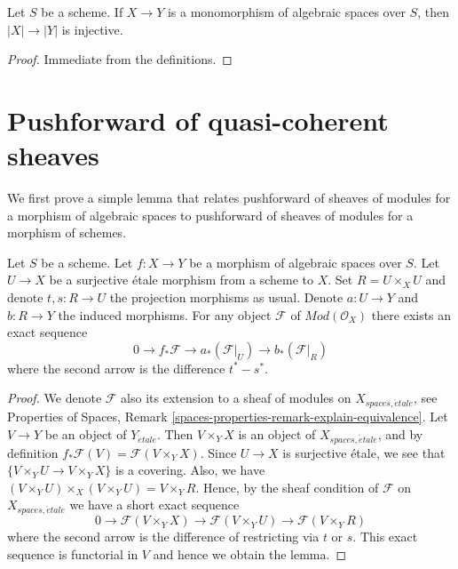 \begin{lemma}
\label{lemma-monomorphism-injective-points}
Let $S$ be a scheme. If $X \to Y$ is a monomorphism of algebraic spaces
over $S$, then $|X| \to |Y|$ is injective.
\end{lemma}

\begin{proof}
Immediate from the definitions.
\end{proof}















\section{Pushforward of quasi-coherent sheaves}
\label{section-pushforward}

\noindent
We first prove a simple lemma that relates pushforward of sheaves of modules
for a morphism of algebraic spaces to pushforward of sheaves of modules for
a morphism of schemes.

\begin{lemma}
\label{lemma-compute-pushforward}
Let $S$ be a scheme.
Let $f : X \to Y$ be a morphism of algebraic spaces over $S$.
Let $U \to X$ be a surjective \'etale morphism from a scheme to $X$.
Set $R = U \times_X U$ and denote $t, s : R \to U$ the projection
morphisms as usual. Denote $a : U \to Y$ and $b : R \to Y$ the induced
morphisms. For any object $\mathcal{F}$ of $\textit{Mod}(\mathcal{O}_X)$
there exists an exact sequence
$$
0 \to f_*\mathcal{F} \to a_*(\mathcal{F}|_U) \to b_*(\mathcal{F}|_R)
$$
where the second arrow is the difference $t^* - s^*$.
\end{lemma}

\begin{proof}
We denote $\mathcal{F}$ also its extension to a sheaf of modules on
$X_{spaces, \acute{e}tale}$, see
Properties of Spaces,
Remark \ref{spaces-properties-remark-explain-equivalence}.
Let $V \to Y$ be an object of $Y_{\acute{e}tale}$. Then $V \times_Y X$ is an
object of $X_{spaces, \acute{e}tale}$, and by definition
$f_*\mathcal{F}(V) = \mathcal{F}(V \times_Y X)$. Since $U \to X$ is
surjective \'etale, we see that $\{V \times_Y U \to V \times_Y X\}$
is a covering. Also, we have
$(V \times_Y U) \times_X (V \times_Y U) = V \times_Y R$.
Hence, by the sheaf condition of $\mathcal{F}$ on
$X_{spaces, \acute{e}tale}$ we have a short exact sequence
$$
0 \to \mathcal{F}(V \times_Y X)
\to \mathcal{F}(V \times_Y U) \to \mathcal{F}(V \times_Y R)
$$
where the second arrow is the difference of restricting via $t$ or $s$.
This exact sequence is functorial in $V$ and hence we obtain the lemma.
\end{proof}

